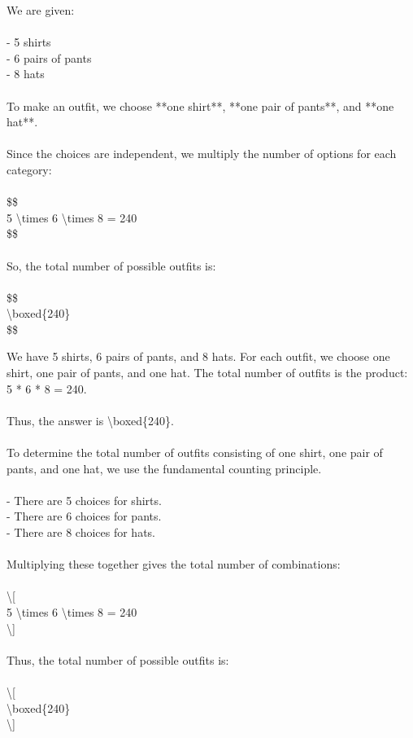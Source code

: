 \begin{minipage}[t]{0.31\linewidth}\raggedright\fontsize{6.5}{7.6}\selectfont\ttfamily
 We are given:\\
\mbox{}\\
- 5 shirts\\
- 6 pairs of pants\\
- 8 hats\\
\mbox{}\\
To make an outfit, we choose **one shirt**, **one pair of pants**, and **one hat**.\\
\mbox{}\\
Since the choices are independent, we multiply the number of options for each category:\\
\mbox{}\\
\$\$\\
5 \textbackslash{}times 6 \textbackslash{}times 8 = 240\\
\$\$\\
\mbox{}\\
So, the total number of possible outfits is:\\
\mbox{}\\
\$\$\\
\textbackslash{}boxed\{240\}\\
\$\$
\end{minipage}
\hfill
\begin{minipage}[t]{0.31\linewidth}\raggedright\fontsize{6.5}{7.6}\selectfont\ttfamily
 We have 5 shirts, 6 pairs of pants, and 8 hats. For each outfit, we choose one shirt, one pair of pants, and one hat. The total number of outfits is the product: 5 * 6 * 8 = 240.\\
\mbox{}\\
Thus, the answer is \textbackslash{}boxed\{240\}.\\
\mbox{}\\
To determine the total number of outfits consisting of one shirt, one pair of pants, and one hat, we use the fundamental counting principle.\\
\mbox{}\\
- There are 5 choices for shirts.\\
- There are 6 choices for pants.\\
- There are 8 choices for hats.\\
\mbox{}\\
Multiplying these together gives the total number of combinations:\\
\mbox{}\\
\textbackslash{}[\\
5 \textbackslash{}times 6 \textbackslash{}times 8 = 240\\
\textbackslash{}]\\
\mbox{}\\
Thus, the total number of possible outfits is:\\
\mbox{}\\
\textbackslash{}[\\
\textbackslash{}boxed\{240\}\\
\textbackslash{}]
\end{minipage}
